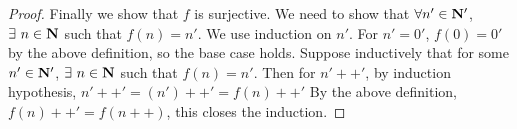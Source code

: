 \begin{proof}
    Finally we show that \(f\) is surjective.
    We need to show that \(\forall n' \in \mathbf{N}'\), \(\exists\ n \in \mathbf{N}\) such that \(f(n) = n'\).
    We use induction on \(n'\).
    For \(n' = 0'\), \(f(0) = 0'\) by the above definition, so the base case holds.
    Suppose inductively that for some \(n' \in \mathbf{N}'\), \(\exists\ n \in \mathbf{N}\) such that \(f(n) = n'\).
    Then for \(n'++'\), by induction hypothesis, \(n'++' = (n')++' = f(n)++'\)
    By the above definition, \(f(n)++' = f(n++)\), this closes the induction.
\end{proof}